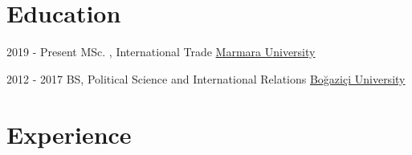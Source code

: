 \documentclass[letterpaper]{ragip_class} %
\begin{document}
\makeprofile %

\section{Education}

\begin{twenty} %
	\twentyitem
	    {2019 - Present}
	    {}
	    { MSc. , International Trade \textnormal{}}
	    {\href{https://www.marmara.edu.tr/en}{Marmara University}}
	    {}
		{}
		
   	\twentyitem
	    {2012 - 2017}
	    {}
	    { BS, Political Science and International Relations \textnormal{}}
	    {\href{http://www.boun.edu.tr/}{Boğaziçi University}}
	    {}
	    {}
\end{twenty}
\section{Experience}
\end{document}

